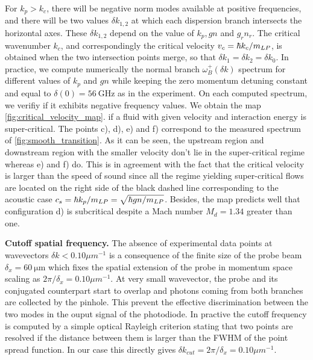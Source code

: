 For $k_p>k_c$, there will be negative norm modes available at positive frequencies, and there will be two values $\delta k_{1,2}$ at which each dispersion branch intersects the horizontal axes. These $\delta k_{1,2}$ depend on the value of $k_p, gn$ and $g_rn_r$. 
The critical wavenumber $k_c$, and correspondingly the critical velocity $v_c=\hbar k_c/m_{LP}$, is obtained when the two intersection points merge, so that $\delta k_1=\delta k_2=\delta k_0$.
In practice, we compute numerically the  normal branch $\omega_B^+(\delta k)$ spectrum for different values of $k_p$ and $gn$ while keeping the zero momentum detuning constant 
and equal to $\delta(0)=\SI{56}{\giga\hertz}$ as in the experiment. On each computed spectrum, we verifiy if it exhibits negative frequency values. We obtain the map  \autoref{fig:critical_velocity_map}.
 if a fluid with given velocity and interaction energy is super-critical. The points c), d), e) and f) correspond to the measured spectrum of \autoref{fig:smooth_transition}.
As it can be seen, the upstream region and downstream region with the smaller velocity don't lie in the super-critical regime whereas e) and f) do. This is in agreement with the fact that the critical velocity is larger than the speed of sound since 
all the regime yielding super-critical flows are located on the right side of the black dashed line corresponding to the acoustic case $c_s = \hbar k_p/m_{LP}=\sqrt{\hbar gn/m_{LP}}$. Besides, the map predicts well that configuration d) is subcritical despite a 
Mach number $M_d=1.34$ greater than one.

\bigskip

\textbf{Cutoff spatial frequency.} The absence of experimental data points at wavevectors $\delta k < 0.10 \mu m^{-1}$ is a consequence of the finite size 
of the probe beam $\delta_x = \SI{60}{\micro\meter}$ which fixes the spatial extension of the probe in momentum space
 scaling as $2\pi/\delta_x=0.10 \mu m^{-1}$. At very small wavevector, the probe and its conjugated counterpart start to overlap and photons
 coming from both branches are collected by the pinhole. This prevent the effective discrimination between the two modes in the ouput signal of the photodiode. In practive the 
 cutoff frequency is computed by a simple optical Rayleigh criterion stating that two points are resolved if the distance between them is larger than the FWHM of the point spread function.
In our case this directly gives $\delta k_{cut} = 2\pi/\delta_x= 0.10 \mu m^{-1}$.

